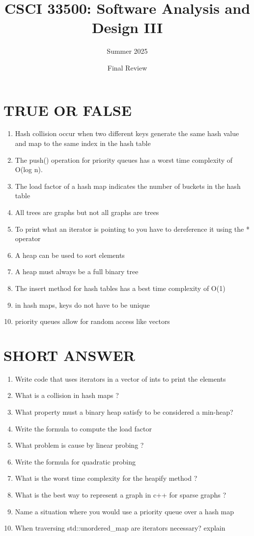 \documentclass[a4paper]{article}
\title{CSCI 33500: Software Analysis and Design III}
\author{Summer 2025}
\date{Final Review}
\begin{document}
\maketitle


\section{TRUE OR FALSE}
\begin{enumerate}
   \item Hash collision occur when two different keys generate the same hash value and map to the same index in the hash table 
   \item The push() operation for priority queues has a worst time complexity of O(log n).
   \item The load factor of a hash map indicates the number of buckets in the hash table
   \item All trees are graphs but not all graphs are trees
   \item To print what an iterator is pointing to you have to dereference it using the * operator
   \item A heap can be used to sort elements
   \item A heap must always be a full binary tree
   \item The insert method for hash tables has a best time complexity of O(1)
   \item in hash maps, keys do not have to be unique
   \item priority queues allow for random access like vectors
\end{enumerate}
\newpage


\section{SHORT ANSWER}
\begin{enumerate}
    \item Write code that uses iterators in a vector of ints to print the elements
    \item What is a collision in hash maps ?
    \item What property must a binary heap satisfy to be considered a min-heap?
    \item Write the formula to compute the load factor 
    \item What problem is cause by linear probing ? 
    \item Write the formula for quadratic probing 
    \item What is the worst time complexity for the heapify method ? 
    \item What is the best way to represent a graph in c++ for sparse graphs ?
    \item Name a situation where you would use a priority queue over a hash map
    \item When traversing std::unordered\_map are iterators necessary? explain
\end{enumerate}
\newpage 
\end{document}
